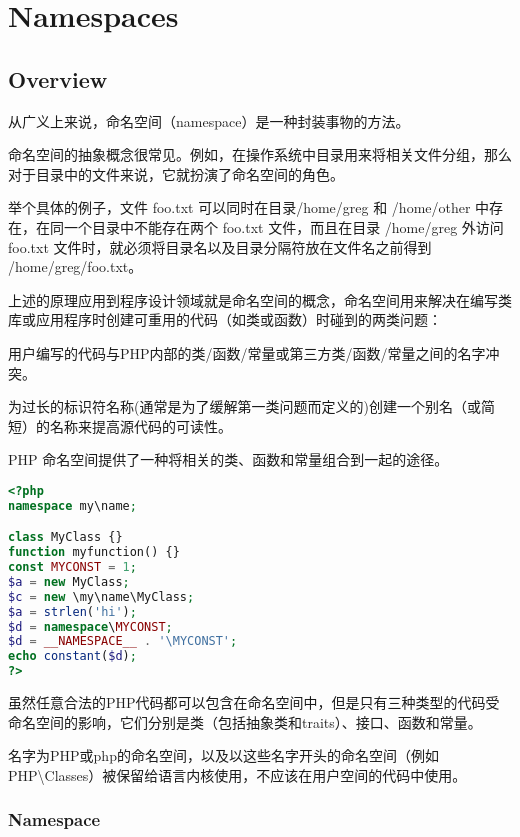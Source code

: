 \part{Namespaces}


\chapter{Overview}


从广义上来说，命名空间（namespace）是一种封装事物的方法。

命名空间的抽象概念很常见。例如，在操作系统中目录用来将相关文件分组，那么对于目录中的文件来说，它就扮演了命名空间的角色。

举个具体的例子，文件 foo.txt 可以同时在目录/home/greg 和 /home/other 中存在，在同一个目录中不能存在两个 foo.txt 文件，而且在目录 /home/greg 外访问 foo.txt 文件时，就必须将目录名以及目录分隔符放在文件名之前得到 /home/greg/foo.txt。

上述的原理应用到程序设计领域就是命名空间的概念，命名空间用来解决在编写类库或应用程序时创建可重用的代码（如类或函数）时碰到的两类问题：

 \begin{compactitem}
\item 用户编写的代码与PHP内部的类/函数/常量或第三方类/函数/常量之间的名字冲突。
\item 为过长的标识符名称(通常是为了缓解第一类问题而定义的)创建一个别名（或简短）的名称来提高源代码的可读性。
\end{compactitem}

PHP 命名空间提供了一种将相关的类、函数和常量组合到一起的途径。


\begin{lstlisting}[language=PHP]
<?php
namespace my\name;

class MyClass {}
function myfunction() {}
const MYCONST = 1;
$a = new MyClass;
$c = new \my\name\MyClass;
$a = strlen('hi'); 
$d = namespace\MYCONST; 
$d = __NAMESPACE__ . '\MYCONST';
echo constant($d);
?>
\end{lstlisting}


虽然任意合法的PHP代码都可以包含在命名空间中，但是只有三种类型的代码受命名空间的影响，它们分别是类（包括抽象类和traits）、接口、函数和常量。

名字为PHP或php的命名空间，以及以这些名字开头的命名空间（例如PHP\textbackslash Classes）被保留给语言内核使用，不应该在用户空间的代码中使用。


\section{Namespace}

